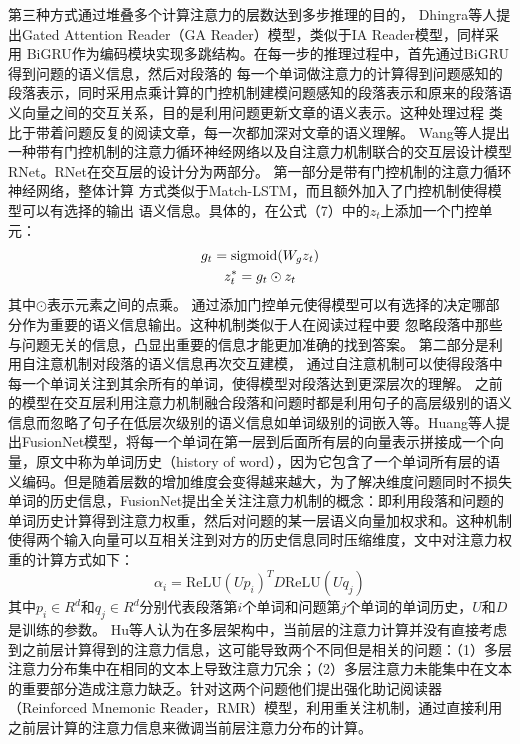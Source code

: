 \noindent
第三种方式通过堆叠多个计算注意力的层数达到多步推理的目的，
Dhingra等人\cite{GAReader}提出Gated Attention Reader（GA Reader）模型，类似于IA Reader模型，同样采用
BiGRU作为编码模块实现多跳结构。在每一步的推理过程中，首先通过BiGRU得到问题的语义信息，然后对段落的
每一个单词做注意力的计算得到问题感知的段落表示，同时采用点乘计算的门控机制建模问题感知的段落表示和原来的段落语义向量之间的交互关系，目的是利用问题更新文章的语义表示。这种处理过程
类比于带着问题反复的阅读文章，每一次都加深对文章的语义理解。
Wang等人\cite{RNet}提出一种带有门控机制的注意力循环神经网络以及自注意力机制联合的交互层设计模型RNet。RNet在交互层的设计分为两部分。
第一部分是带有门控机制的注意力循环神经网络，整体计算
方式类似于Match-LSTM，而且额外加入了门控机制使得模型可以有选择的输出
语义信息。具体的，在公式（7）中的$z_t$上添加一个门控单元：
\begin{gather}
g_t=\text{sigmoid}(W_gz_t)\notag \\
z_t^{*}=g_t\odot z_t
\end{gather}
其中$\odot$表示元素之间的点乘。
通过添加门控单元使得模型可以有选择的决定哪部分作为重要的语义信息输出。这种机制类似于人在阅读过程中要
忽略段落中那些与问题无关的信息，凸显出重要的信息才能更加准确的找到答案。
第二部分是利用自注意机制对段落的语义信息再次交互建模，
通过自注意机制可以使得段落中每一个单词关注到其余所有的单词，使得模型对段落达到更深层次的理解。
之前的模型在交互层利用注意力机制融合段落和问题时都是利用句子的高层级别的语义信息而忽略了句子在低层次级别的语义信息如单词级别的词嵌入等。Huang等人提出FusionNet模型，将每一个单词在第一层到后面所有层的向量表示拼接成一个向量，原文中称为单词历史（history of word），因为它包含了一个单词所有层的语义编码。但是随着层数的增加维度会变得越来越大，为了解决维度问题同时不损失单词的历史信息，FusionNet提出全关注注意力机制的概念：即利用段落和问题的单词历史计算得到注意力权重，然后对问题的某一层语义向量加权求和。这种机制使得两个输入向量可以互相关注到对方的历史信息同时压缩维度，文中对注意力权重的计算方式如下：
\begin{equation}
\alpha_i=\text{ReLU}(Up_i)^TD\text{ReLU}(Uq_j)
\end{equation}
其中$p_i\in R^d$和$q_j\in R^d$分别代表段落第$i$个单词和问题第$j$个单词的单词历史，$U$和$D$是训练的参数。
%
Hu等人认为在多层架构中，当前层的注意力计算并没有直接考虑到之前层计算得到的注意力信息，这可能导致两个不同但是相关的问题：（1）多层注意力分布集中在相同的文本上导致注意力冗余；（2）多层注意力未能集中在文本的重要部分造成注意力缺乏。针对这两个问题他们提出强化助记阅读器（Reinforced Mnemonic Reader，RMR）模型，利用重关注机制，通过直接利用之前层计算的注意力信息来微调当前层注意力分布的计算。

